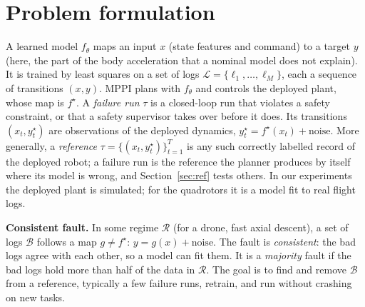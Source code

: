 \documentclass[preprint,12pt]{elsarticle}
\begin{document}
\section{Problem formulation}\label{sec:problem}

A learned model $f_\theta$ maps an input $x$ (state features and command) to a target $y$ (here, the part of the body acceleration that a nominal model does not explain). It is trained by least squares on a set of logs $\mathcal{L}=\{\ell_1,\dots,\ell_M\}$, each a sequence of transitions $(x,y)$. MPPI plans with $f_\theta$ and controls the deployed plant, whose map is $f^\star$. A \emph{failure run} $\tau$ is a closed-loop run that violates a safety constraint, or that a safety supervisor takes over before it does. Its transitions $(x_t,y^\star_t)$ are observations of the deployed dynamics, $y^\star_t=f^\star(x_t)+\text{noise}$. More generally, a \emph{reference} $\tau=\{(x_t,y^\star_t)\}_{t=1}^{T}$ is any such correctly labelled record of the deployed robot; a failure run is the reference the planner produces by itself where its model is wrong, and Section~\ref{sec:ref} tests others. In our experiments the deployed plant is simulated; for the quadrotors it is a model fit to real flight logs.

\textbf{Consistent fault.} In some regime $\mathcal{R}$ (for a drone, fast axial descent), a set of logs $\mathcal{B}$ follows a map $g\neq f^\star$: $y=g(x)+\text{noise}$. The fault is \emph{consistent}: the bad logs agree with each other, so a model can fit them. It is a \emph{majority} fault if the bad logs hold more than half of the data in $\mathcal{R}$. The goal is to find and remove $\mathcal{B}$ from a reference, typically a few failure runs, retrain, and run without crashing on new tasks.
\end{document}
